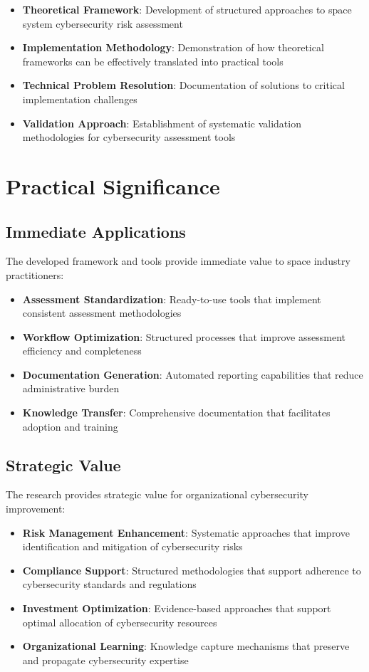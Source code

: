 \documentclass[binding=0.6cm]{sapthesis}
\begin{document}
\begin{itemize}
    \item \textbf{Theoretical Framework}: Development of structured approaches to space system cybersecurity risk assessment
    \item \textbf{Implementation Methodology}: Demonstration of how theoretical frameworks can be effectively translated into practical tools
    \item \textbf{Technical Problem Resolution}: Documentation of solutions to critical implementation challenges
    \item \textbf{Validation Approach}: Establishment of systematic validation methodologies for cybersecurity assessment tools
\end{itemize}

\section{Practical Significance}

\subsection{Immediate Applications}

The developed framework and tools provide immediate value to space industry practitioners:

\begin{itemize}
    \item \textbf{Assessment Standardization}: Ready-to-use tools that implement consistent assessment methodologies
    \item \textbf{Workflow Optimization}: Structured processes that improve assessment efficiency and completeness
    \item \textbf{Documentation Generation}: Automated reporting capabilities that reduce administrative burden
    \item \textbf{Knowledge Transfer}: Comprehensive documentation that facilitates adoption and training
\end{itemize}

\subsection{Strategic Value}

The research provides strategic value for organizational cybersecurity improvement:

\begin{itemize}
    \item \textbf{Risk Management Enhancement}: Systematic approaches that improve identification and mitigation of cybersecurity risks
    \item \textbf{Compliance Support}: Structured methodologies that support adherence to cybersecurity standards and regulations
    \item \textbf{Investment Optimization}: Evidence-based approaches that support optimal allocation of cybersecurity resources
    \item \textbf{Organizational Learning}: Knowledge capture mechanisms that preserve and propagate cybersecurity expertise
\end{itemize}
\end{document}
